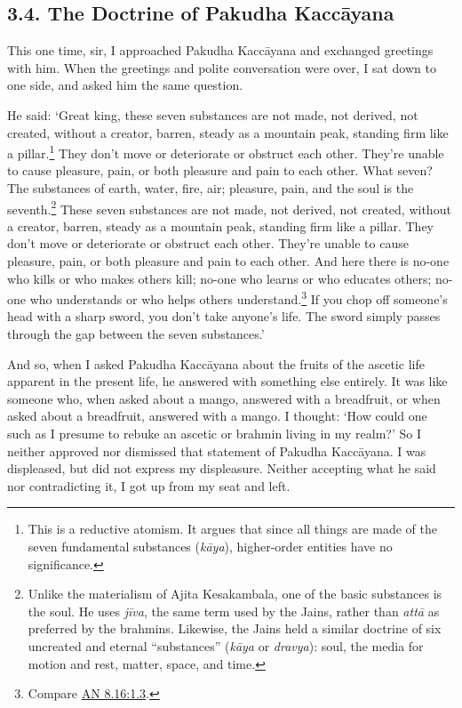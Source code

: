 \documentclass[12pt,openany]{book}%
\begin{document}
\subsection*{3.4. The Doctrine of Pakudha \textsanskrit{Kaccāyana} }

This one time, sir, I approached Pakudha \textsanskrit{Kaccāyana} and exchanged greetings with him. When the greetings and polite conversation were over, I sat down to one side, and asked him the same question. 

He said: ‘Great king, these seven substances are not made, not derived, not created, without a creator, barren, steady as a mountain peak, standing firm like a pillar.\footnote{This is a reductive atomism. It argues that since all things are made of the seven fundamental substances (\textit{\textsanskrit{kāya}}), higher-order entities have no significance. } They don’t move or deteriorate or obstruct each other. They’re unable to cause pleasure, pain, or both pleasure and pain to each other. What seven? The substances of earth, water, fire, air; pleasure, pain, and the soul is the seventh.\footnote{Unlike the materialism of Ajita Kesakambala, one of the basic substances is the soul. He uses \textit{\textsanskrit{jīva}}, the same term used by the Jains, rather than \textit{\textsanskrit{attā}} as preferred by the brahmins. Likewise, the Jains held a similar doctrine of six uncreated and eternal “substances” (\textit{\textsanskrit{kāya}} or \textit{dravya}): soul, the media for motion and rest, matter, space, and time. } These seven substances are not made, not derived, not created, without a creator, barren, steady as a mountain peak, standing firm like a pillar. They don’t move or deteriorate or obstruct each other. They’re unable to cause pleasure, pain, or both pleasure and pain to each other. And here there is no-one who kills or who makes others kill; no-one who learns or who educates others; no-one who understands or who helps others understand.\footnote{Compare \href{https://suttacentral.net/an8.16/en/sujato\#1.3}{AN 8.16:1.3}. } If you chop off someone’s head with a sharp sword, you don’t take anyone’s life. The sword simply passes through the gap between the seven substances.’ 

And so, when I asked Pakudha \textsanskrit{Kaccāyana} about the fruits of the ascetic life apparent in the present life, he answered with something else entirely. It was like someone who, when asked about a mango, answered with a breadfruit, or when asked about a breadfruit, answered with a mango. I thought: ‘How could one such as I presume to rebuke an ascetic or brahmin living in my realm?’ So I neither approved nor dismissed that statement of Pakudha \textsanskrit{Kaccāyana}. I was displeased, but did not express my displeasure. Neither accepting what he said nor contradicting it, I got up from my seat and left. 
\end{document}
